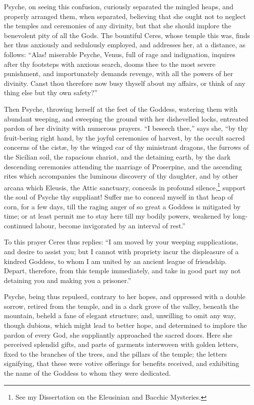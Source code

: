 \documentclass[12pt]{article}
\begin{document}
Psyche, on seeing this confusion, curiously separated the mingled heaps, and
properly arranged them, when separated, believing that she ought not to neglect
the temples and ceremonies of any divinity, but that she should implore the
benevolent pity of all the Gods. The bountiful Ceres, whose temple this was,
finds her thus anxiously and sedulously employed, and addresses her, at a
distance, as follows: ``Alas! miserable Psyche, Venus, full of rage and
indignation, inquires after thy footsteps with anxious search, dooms thee to
the most severe punishment, and importunately demands revenge, with all the
powers of her divinity. Canst thou therefore now busy thyself about my affairs,
or think of any thing else but thy own safety?''

Then Psyche, throwing herself at the feet of the Goddess, watering them with
abundant weeping, and sweeping the ground with her dishevelled locks, entreated
pardon of her divinity with numerous prayers. ``I beseech thee,'' says she,
``by thy fruit-bering right hand, by the joyful ceremonies of harvest, by the
occult sacred concerns of the cist{\ae}, by the winged car of thy ministrant
dragons, the furrows of the Sicilian soil, the rapacious chariot, and the
detaining earth, by the dark descending ceremonies attending the marriage of
Proserpine, and the ascending rites which accompanies the luminous discovery of
thy daughter, and by other arcana which Eleusis, the Attic sanctuary, conceals
in profound silence,\footnote{See my Dissertation on the Eleusinian and Bacchic
Mysteries.} support the soul of Psyche thy suppliant! Suffer me to conceal
myself in that heap of corn, for a few days, till the raging anger of so great
a Goddess is mitigated by time; or at least permit me to stay here till my
bodily powers, weakened by long-continued labour, become invigorated by an
interval of rest.''

To this prayer Ceres thus replies: ``I am moved by your weeping supplications,
and desire to assist you; but I cannot with propriety incur the displeasure of
a kindred Goddess, to whom I am united by an ancient league of friendship.
Depart, therefore, from this temple immediately, and take in good part my not
detaining you and making you a prisoner.''

Psyche, being thus repulsed, contrary to her hopes, and oppressed with a double
sorrow, retired from the temple, and in a dark grove of the valley, beneath the
mountain, beheld a fane of elegant structure; and, unwilling to omit any way,
though dubious, which might lead to better hope, and determined to implore the
pardon of every God, she suppliantly approached the sacred doors. Here she
perceived splendid gifts, and parts of garments interwoven with golden letters,
fixed to the branches of the trees, and the pillars of the temple; the letters
signifying, that these were votive offerings for benefits received, and
exhibiting the name of the Goddess to whom they were dedicated.
\end{document}
